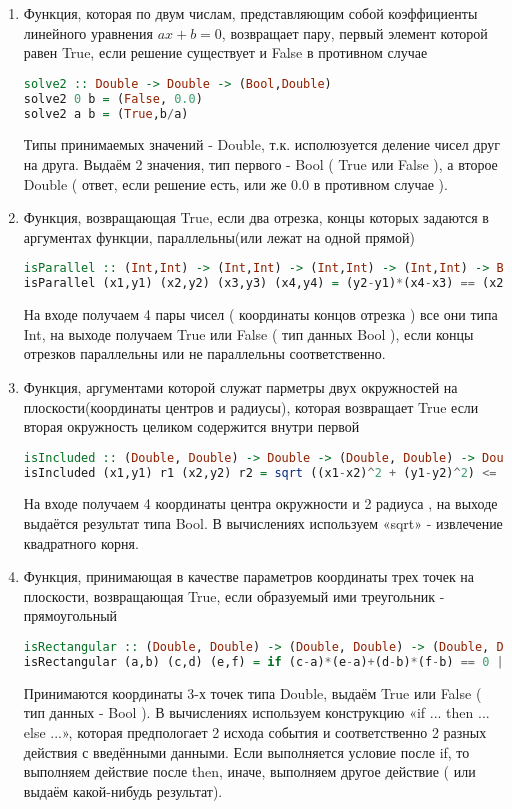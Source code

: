 \documentclass[14pt]{article}
\begin{document}
\begin{enumerate}
\item Функция, которая по двум числам, представляющим собой коэффициенты линейного уравнения $ax + b = 0$, возвращает пару, первый элемент которой равен True, если решение существует и False в противном случае

\begin{lstlisting}[language=haskell]
solve2 :: Double -> Double -> (Bool,Double)
solve2 0 b = (False, 0.0)
solve2 a b = (True,b/a)
\end{lstlisting}
Типы принимаемых значений - Double, т.к. исполюзуется деление чисел друг на друга. Выдаём 2 значения, тип первого - Bool ( True или False ), а второе Double ( ответ, если решение есть, или же 0.0 в противном случае ).

\item Функция, возвращающая True, если два отрезка, концы которых задаются в аргументах функции, параллельны(или лежат на одной прямой)

\begin{lstlisting}[language=haskell]
isParallel :: (Int,Int) -> (Int,Int) -> (Int,Int) -> (Int,Int) -> Bool
isParallel (x1,y1) (x2,y2) (x3,y3) (x4,y4) = (y2-y1)*(x4-x3) == (x2-x1)*(y4-y3)
\end{lstlisting}
На входе получаем 4 пары чисел ( координаты концов отрезка ) все они типа Int, на выходе получаем True или False ( тип данных Bool ), если концы отрезков параллельны или не параллельны соответственно.

\item Функция, аргументами которой служат парметры двух окружностей на плоскости(координаты центров и радиусы), которая возвращает True если вторая окружность целиком содержится внутри первой

\begin{lstlisting}[language=haskell]
isIncluded :: (Double, Double) -> Double -> (Double, Double) -> Double -> Bool
isIncluded (x1,y1) r1 (x2,y2) r2 = sqrt ((x1-x2)^2 + (y1-y2)^2) <= r1-r2
\end{lstlisting}
На входе получаем 4 координаты центра окружности и 2 радиуса , на выходе выдаётся результат типа Bool. В вычислениях используем «sqrt» - извлечение квадратного корня.

\item Функция, принимающая в качестве параметров координаты трех точек на плоскости, возвращающая True, если образуемый ими треугольник - прямоугольный 

\begin{lstlisting}[language=haskell]
isRectangular :: (Double, Double) -> (Double, Double) -> (Double, Double) -> Bool
isRectangular (a,b) (c,d) (e,f) = if (c-a)*(e-a)+(d-b)*(f-b) == 0 || (a-c)*(e-c)+(b-d)*(f-d) == 0 || (a-e)*(c-e)+(b-f)*(d-f) == 0 then True else False
\end{lstlisting}
Принимаются координаты 3-х точек типа Double, выдаём True или False ( тип данных - Bool ). В вычислениях используем конструкцию «if ... then ... else ...», которая предпологает 2 исхода события и соответственно 2 разных действия с введёнными данными. Если выполняется условие после if, то выполняем действие после then, иначе, выполняем другое действие ( или выдаём какой-нибудь результат).


\end{enumerate}
\end{document}
